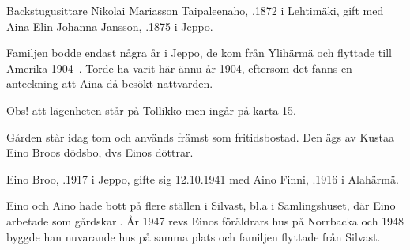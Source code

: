 Backstugusittare Nikolai Mariasson Taipaleenaho, .1872 i Lehtimäki, gift med Aina Elin Johanna Jansson, .1875 i Jeppo.
\begin{jhchildren}
  \item {}
  \item {}
  \item {}
\end{jhchildren}

Familjen bodde endast några år i Jeppo, de kom från Ylihärmä och flyttade till Amerika 1904--. Torde ha varit här ännu år 1904, eftersom det fanns en anteckning att Aina då besökt nattvarden.



Obs! att lägenheten står på Tollikko men ingår på karta 15.


Gården står idag tom och används främst som fritidsbostad. Den ägs av Kustaa Eino Broos dödsbo, dvs Einos döttrar.\jhvspace{}



Eino Broo, .1917 i Jeppo, gifte sig 12.10.1941 med Aino Finni, .1916 i Alahärmä.
\begin{jhchildren}
  \item {}
  \item {}
  \item {}
  \item {}
\end{jhchildren}
Eino och Aino hade bott på flere ställen i Silvast, bl.a i Samlingshuset, där Eino arbetade som gårdskarl. År 1947 revs Einos föräldrars hus på Norrbacka och 1948 byggde han nuvarande hus på samma plats och familjen flyttade från Silvast.

